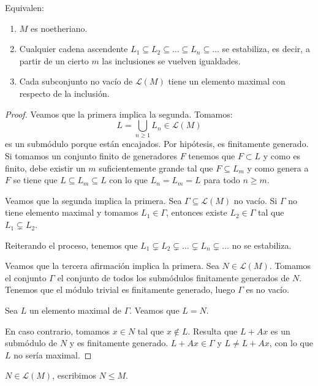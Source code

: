\begin{prop}
  Equivalen:
  \begin{enumerate}
    \item \(M\) es noetheriano.
    \item Cualquier cadena ascendente \(L_1\subseteq L_2\subseteq\ldots
      \subseteq L_n\subseteq\ldots\) se estabiliza, es decir,
      a partir de un cierto \(m\) las inclusiones se vuelven igualdades.
    \item Cada subconjunto no vacío de \(\mathcal{L}(M)\) tiene un elemento
      maximal con respecto de la inclusión.
  \end{enumerate}
\end{prop}
\begin{proof}
  Veamos que la primera implica la segunda.
  Tomamos:
  \[
    L=\bigcup_{n\ge 1} L_n\in\mathcal{L}(M)
  \]
  es un submódulo porque están encajados. Por hipótesis, es finitamente
  generado. Si tomamos un conjunto finito de generadores \(F\)
  tenemos que \(F\subset L\) y como es finito, debe existir un \(m\)
  suficientemente grande tal que \(F\subseteq L_m\) y como
  genera a \(F\) se tiene que \(L\subseteq L_m\subseteq L\)
  con lo que \(L_n=L_m=L\) para todo \(n\ge m\).

  Veamos que la segunda implica la primera. Sea \(\Gamma\subseteq
  \mathcal{L}(M)\) no vacío. Si \(\Gamma\) no tiene elemento maximal
  y tomamos \(L_1\in\Gamma\), entonces existe \(L_2\in\Gamma\)
  tal que \(L_1\subsetneq L_2\).

  Reiterando el proceso, tenemos que \(L_1\subsetneq L_2\subsetneq
  \ldots\subsetneq L_n\subsetneq\ldots\) no se estabiliza.

  Veamos que la tercera afirmación implica la primera.
  Sea \(N\in\mathcal{L}(M)\).
  Tomamos el conjunto \(\Gamma\) el conjunto de todos los submódulos
  finitamente generados de \(N\). Tenemos que el módulo trivial
  es finitamente generado, luego \(\Gamma\) es no vacío.

  Sea \(L\) un elemento maximal de \(\Gamma\). Veamos que \(L=N\).

  En caso contrario, tomamos \(x\in N\) tal que \(x\notin L\). Resulta que
  \(L+Ax\) es un submódulo de \(N\) y es finitamente generado.
  \(L+Ax\in\Gamma\) y \(L\neq L+Ax\), con lo que \(L\) no sería maximal.
\end{proof}

\begin{nt}
  \(N\in\mathcal{L}(M)\), escribimos \(N\le M\).
\end{nt}

